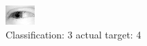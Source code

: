 \begin{figure}[h!]
\begin{center}
\includegraphics[width=0.60\columnwidth]{figures/ID2483_class_3_target_4.png}
\end{center}
\caption{ Classification: 3 actual target: 4}
\label{fig:ID2483_class_3_target_4}
\end{figure}
